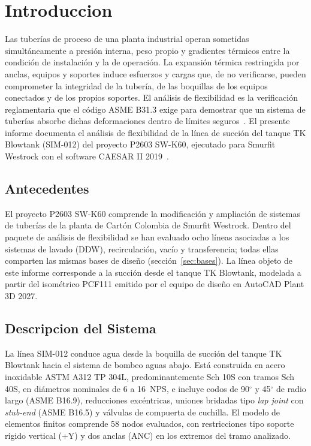 \section{Introduccion}
\label{sec:intro}

Las tuber\'{i}as de proceso de una planta industrial operan sometidas
simult\'{a}neamente a presi\'{o}n interna, peso propio y gradientes t\'{e}rmicos
entre la condici\'{o}n de instalaci\'{o}n y la de operaci\'{o}n. La expansi\'{o}n
t\'{e}rmica restringida por anclas, equipos y soportes induce esfuerzos y cargas
que, de no verificarse, pueden comprometer la integridad de la tuber\'{i}a, de las
boquillas de los equipos conectados y de los propios soportes. El an\'{a}lisis de
flexibilidad es la verificaci\'{o}n reglamentaria que el c\'{o}digo ASME B31.3
exige para demostrar que un sistema de tuber\'{i}as absorbe dichas deformaciones
dentro de l\'{i}mites seguros~\cite{asme_b313_2016}. El presente informe documenta
el an\'{a}lisis de flexibilidad de la l\'{i}nea de succi\'{o}n del tanque TK
Blowtank (SIM-012) del proyecto P2603 SW-K60, ejecutado para Smurfit Westrock
con el software CAESAR II 2019~\cite{caesar2_ug_2019}.

\subsection{Antecedentes}

El proyecto P2603 SW-K60 comprende la modificaci\'{o}n y ampliaci\'{o}n de
sistemas de tuber\'{i}as de la planta de Cart\'{o}n Colombia de Smurfit Westrock.
Dentro del paquete de an\'{a}lisis de flexibilidad se han evaluado ocho
l\'{i}neas asociadas a los sistemas de lavado (DDW), recirculaci\'{o}n, vac\'{i}o
y transferencia; todas ellas comparten las mismas bases de dise\~{n}o
(secci\'{o}n~\ref{sec:bases}). La l\'{i}nea objeto de este informe corresponde a
la succi\'{o}n desde el tanque TK Blowtank, modelada a partir del isom\'{e}trico
PCF111 emitido por el equipo de dise\~{n}o en AutoCAD Plant 3D 2027.

\subsection{Descripcion del Sistema}

La l\'{i}nea SIM-012 conduce agua desde la boquilla de succi\'{o}n del tanque TK
Blowtank hacia el sistema de bombeo aguas abajo. Est\'{a} construida en acero
inoxidable ASTM A312 TP 304L, predominantemente Sch 10S con tramos Sch 40S, en
di\'{a}metros nominales de 6 a 16~NPS, e incluye codos de 90$^\circ$ y
45$^\circ$ de radio largo (ASME B16.9), reducciones exc\'{e}ntricas, uniones
bridadas tipo \textit{lap joint} con \textit{stub-end} (ASME B16.5) y v\'{a}lvulas
de compuerta de cuchilla. El modelo de elementos finitos comprende 58 nodos
evaluados, con restricciones tipo soporte r\'{i}gido vertical (+Y) y dos anclas
(ANC) en los extremos del tramo analizado.

